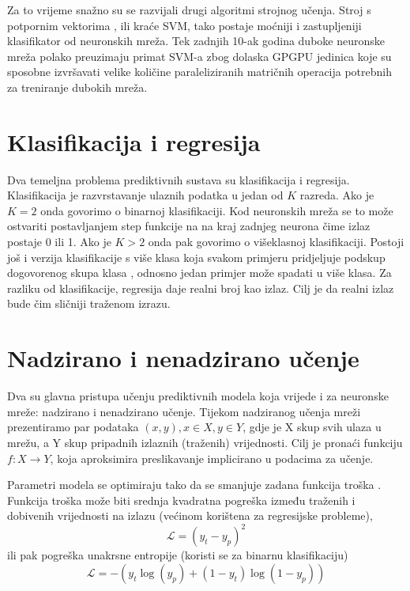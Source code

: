 \documentclass[times, utf8, diplomski, numeric]{fer}
\begin{document}
Za to vrijeme snažno su se razvijali drugi algoritmi strojnog učenja. Stroj s potpornim vektorima , ili kraće SVM, tako postaje moćniji i zastupljeniji klasifikator od neuronskih mreža. Tek zadnjih 10-ak godina duboke neuronske mreža polako preuzimaju primat SVM-a zbog dolaska GPGPU  jedinica koje su sposobne izvršavati velike količine paraleliziranih matričnih operacija potrebnih za treniranje dubokih mreža.

\section{Klasifikacija i regresija}
Dva temeljna problema prediktivnih sustava su klasifikacija i regresija.
Klasifikacija je razvrstavanje ulaznih podatka u jedan od $K$ razreda. Ako je $K = 2$ onda govorimo o binarnoj klasifikaciji. Kod neuronskih mreža se to može ostvariti postavljanjem step funkcije na na kraj zadnjeg neurona čime izlaz postaje 0 ili 1.
Ako je $K > 2$ onda pak govorimo o višeklasnoj  klasifikaciji. Postoji još i verzija klasifikacije s više klasa koja svakom primjeru pridjeljuje podskup dogovorenog skupa klasa , odnosno jedan primjer može spadati u više klasa.
Za razliku od klasifikacije, regresija daje realni broj kao izlaz. Cilj je da realni izlaz bude čim sličniji traženom izrazu.

\section{Nadzirano i nenadzirano učenje}
Dva su glavna pristupa učenju prediktivnih modela koja vrijede i za neuronske mreže: nadzirano i nenadzirano učenje. Tijekom nadziranog učenja mreži prezentiramo par podataka $(x, y), x \in X, y \in Y$, gdje je X skup svih ulaza u mrežu, a Y skup pripadnih izlaznih (traženih) vrijednosti.
Cilj je pronaći funkciju $f: X \to Y$, koja aproksimira preslikavanje implicirano u podacima za učenje.

Parametri modela se optimiraju tako da se smanjuje zadana funkcija troška . Funkcija troška može biti srednja kvadratna pogreška između traženih i dobivenih vrijednosti na izlazu (većinom korištena za regresijske probleme),
\begin{equation}
	\mathcal{L} = (y_t - y_p)^2
\end{equation}
ili pak pogreška unakrsne entropije (koristi se za binarnu klasifikaciju)
\begin{equation}
	\mathcal{L} = -(y_t \log(y_p) + (1 - y_t) \log(1 - y_p))
\end{equation}
\end{document}
